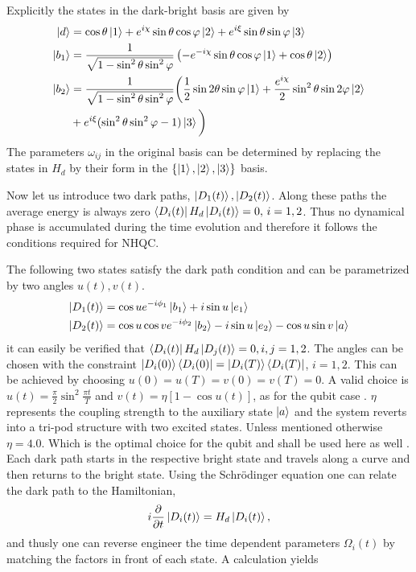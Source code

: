 Explicitly the states in the dark-bright basis are given by 
\begin{equation}
\label{eq:states}
\begin{aligned}
\ket{d} &= \cos\theta\ket{1} + e^{i\chi}\sin\theta\cos\varphi\ket{2} + e^{i\xi}\sin\theta\sin\varphi\ket{3}
\\
\ket{b_1} &= \frac{1}{\sqrt{1-\sin^2\theta\sin^2\varphi}} \left(-e^{-i\chi}\sin\theta\cos\varphi\ket{1} + \cos\theta\ket{2} \right)
\\
\ket{b_2} &= \frac{1}{\sqrt{1-\sin^2\theta\sin^2\varphi}} \bigg(\frac{1}{2}\sin 2\theta\sin\varphi\ket{1} + \dfrac{e^{i\chi}}{2}\sin^2\theta\sin 2\varphi\ket{2} \\&+ e^{i\xi}(\sin^2\theta\sin^2\varphi - 1)\ket{3}\bigg)
\end{aligned}
\end{equation}
The parameters $\omega_{ij}$ in the original basis can be determined by replacing the states in $H_d$ by their form in the $\{\ket{1},\ket{2},\ket{3}\}$ basis.

Now let us introduce two dark paths, $\ket{D_1(t)},\ket{D_2(t)}$. Along these paths the average energy is always zero $\bra{D_i(t)}H_d\ket{D_i(t)} = 0,\,i = 1,2$. Thus no dynamical phase is accumulated during the time evolution and therefore it follows the conditions required for NHQC.

The following two states satisfy the dark path condition and can be parametrized by two angles $u(t), v(t)$.
\begin{equation}
\label{eq:dpaths}
\begin{aligned}
\ket{D_1(t)} &= \cos u e^{-i\phi_1}\ket{b_1} + i\sin u \ket{e_1}
\\
\ket{D_2(t)} &= \cos u\cos v e^{-i\phi_2}\ket{b_2} - i\sin u \ket{e_2} - \cos u\sin v \ket{a}
\end{aligned}
\end{equation}
it can easily be verified that $\bra{D_i(t)}H_d\ket{D_j(t)} = 0, i,j = 1,2$. The angles can be chosen with the constraint $\ket{D_i(0)}\bra{D_i(0)} = \ket{D_i(T)}\bra{D_i(T)}$, $i = 1,2$. This can be achieved by choosing $u(0) = u(T) = v(0) = v(T) = 0$. A valid choice is $u(t) = \frac{\pi}{2}\sin^2\frac{\pi t}{T}$ and $v(t) = \eta\left[1 - \cos u(t)\right]$, as for the qubit case \cite{darkpath}. $\eta$ represents the coupling strength to the auxiliary state $\ket{a}$ and the system reverts into a tri-pod structure with two excited states. Unless mentioned otherwise $\eta = 4.0$. Which is the optimal choice for the qubit and shall be used here as well \cite{darkpath}. Each dark path starts in the respective bright state and travels along a curve and then returns to the bright state. Using the Schrödinger equation one can relate the dark path to the Hamiltonian,
\begin{equation}
i\pdv{}{t}\ket{D_i(t)} = H_d\ket{D_i(t)},
\end{equation}
and thusly one can reverse engineer the time dependent parameters $\Omega_i(t)$ by matching the factors in front of each state. A calculation yields 

